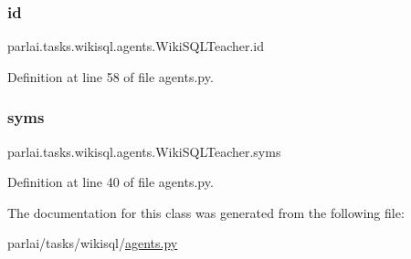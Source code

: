 \subsubsection{\texorpdfstring{id}{id}}
{\footnotesize\ttfamily parlai.\+tasks.\+wikisql.\+agents.\+Wiki\+S\+Q\+L\+Teacher.\+id}



Definition at line 58 of file agents.\+py.

\mbox{\label{classparlai_1_1tasks_1_1wikisql_1_1agents_1_1WikiSQLTeacher_a1a67c761791a412586131dd7dd595a7c}} 
\subsubsection{\texorpdfstring{syms}{syms}}
{\footnotesize\ttfamily parlai.\+tasks.\+wikisql.\+agents.\+Wiki\+S\+Q\+L\+Teacher.\+syms}



Definition at line 40 of file agents.\+py.



The documentation for this class was generated from the following file\+:\begin{DoxyCompactItemize}
\item 
parlai/tasks/wikisql/\hyperlink{parlai_2tasks_2wikisql_2agents_8py}{agents.\+py}\end{DoxyCompactItemize}
